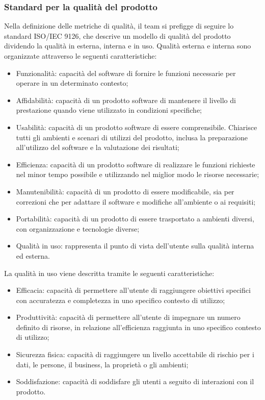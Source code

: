 \documentclass[10pt, a4paper]{article}
\begin{document}
\subsubsection{Standard per la qualità del prodotto}
Nella definizione delle metriche di qualità, il team si prefigge di seguire lo standard ISO/IEC 9126, che descrive un modello di qualità del prodotto
dividendo la qualità in esterna, interna e in uso.
Qualità esterna e interna sono organizzate attraverso le seguenti caratteristiche:
\begin{itemize}
    \item Funzionalità: capacità del software di fornire le funzioni necessarie per operare in un determinato contesto;
    \item Affidabilità: capacità di un prodotto software di mantenere il livello di prestazione quando viene utilizzato in condizioni specifiche;
    \item Usabilità: capacità di un prodotto software di essere comprensibile. Chiarisce tutti gli ambienti e scenari di utilizzi del prodotto, 
        inclusa la preparazione all'utilizzo del software e la valutazione dei risultati;
    \item Efficienza: capacità di un prodotto software di realizzare le funzioni richieste nel minor tempo possibile e utilizzando nel miglior modo le risorse necessarie;
    \item Manutenibilità: capacità di un prodotto di essere modificabile, sia per correzioni che per adattare il software e modifiche all'ambiente o ai requisiti;
    \item Portabilità: capacità di un prodotto di essere trasportato a ambienti diversi, con organizzazione e tecnologie diverse;
    \item Qualità in uso: rappresenta il punto di vista dell'utente sulla qualità interna ed esterna. 
\end{itemize}

La qualità in uso viene descritta tramite le seguenti caratteristiche:
\begin{itemize}
    \item Efficacia: capacità di permettere all'utente di raggiungere obiettivi specifici con accuratezza e completezza in uno specifico contesto di utilizzo;
    \item Produttività: capacità di permettere all'utente di impegnare un numero definito di risorse, in relazione all'efficienza raggiunta in uno specifico contesto di utilizzo;
    \item Sicurezza fisica: capacità di raggiungere un livello accettabile di rischio per i dati, le persone, il business, la proprietà o gli ambienti;
    \item Soddisfazione: capacità di soddisfare gli utenti a seguito di interazioni con il prodotto. 
\end{itemize}
\end{document}
